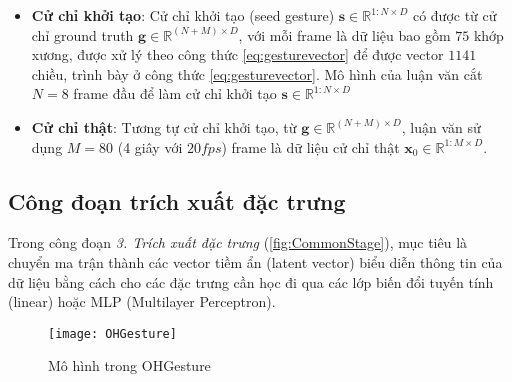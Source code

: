 \begin{itemize}
		\item \textbf{Cử chỉ khởi tạo}: Cử chỉ khởi tạo (seed gesture) $\mathbf{s} \in \mathbb{R}^{1:N \times D}$ có được từ cử chỉ ground truth $
		\mathbf{g} \in \mathbb{R}^{(N+M) \times D}$, với mỗi frame là dữ liệu bao gồm $75$ khớp xương, được xử lý theo công thức \autoref{eq:gesturevector} để được vector $1141$ chiều, trình bày ở công thức \autoref{eq:gesturevector}. Mô hình của luận văn cắt $N = 8$ frame đầu để làm cử chỉ khởi tạo $\mathbf{s} \in \mathbb{R}^{1:N \times D} $
		
		\item \textbf{Cử chỉ thật}: Tương tự cử chỉ khởi tạo, từ $
		\mathbf{g} \in \mathbb{R}^{(N+M) \times D}$, luận văn sử dụng $M = 80$ (4 giây với $20fps$) frame là dữ liệu cử chỉ thật $\mathbf{x}_{0} \in \mathbb{R}^{1:M \times D}$. 
\end{itemize}

\subsection{Công đoạn trích xuất đặc trưng}
\label{subsec:feature_extraction}

Trong công đoạn \textit{3. Trích xuất đặc trưng} (\autoref{fig:CommonStage}), mục tiêu là chuyển ma trận thành các vector tiềm ẩn (latent vector) biểu diễn thông tin của dữ liệu bằng cách cho các đặc trưng cần học đi qua các lớp biến đổi tuyến tính (linear) hoặc MLP (Multilayer Perceptron).

\begin{figure}[H]
	\centering
	\texttt{[image: OHGesture]}
	\caption{Mô hình trong OHGesture}
	\label{fig:OHGesture}
\end{figure}
\vspace{-10pt}

